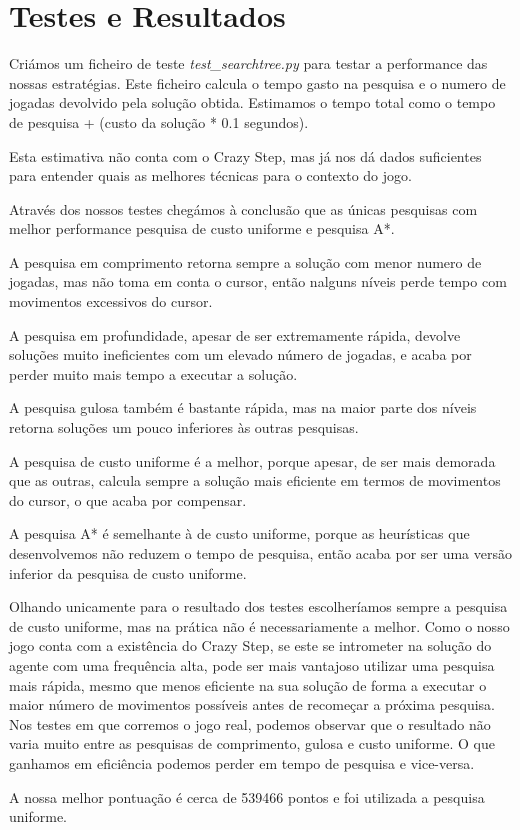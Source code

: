 \documentclass[12pt]{report}
\begin{document}
\newpage

\chapter{Testes e Resultados}

\par Criámos um ficheiro de teste \emph{test\_searchtree.py} para testar a performance das nossas estratégias. Este ficheiro calcula o tempo gasto na pesquisa e o numero de jogadas devolvido pela solução obtida. Estimamos o tempo total como o tempo de pesquisa + (custo da solução * 0.1 segundos).
\par Esta estimativa não conta com o Crazy Step, mas já nos dá dados suficientes para entender quais as melhores técnicas para o contexto do jogo.

\par Através dos nossos testes chegámos à conclusão que as únicas pesquisas com melhor performance pesquisa de custo uniforme e pesquisa A*.
\par A pesquisa em comprimento retorna sempre a solução com menor numero de jogadas, mas não toma em conta o cursor, então nalguns níveis perde tempo com movimentos excessivos do cursor.
\par A pesquisa em profundidade, apesar de ser extremamente rápida, devolve soluções muito ineficientes com um elevado número de jogadas, e acaba por perder muito mais tempo a executar a solução.
\par A pesquisa gulosa também é bastante rápida, mas na maior parte dos níveis retorna soluções um pouco inferiores às outras pesquisas.
\par A pesquisa de custo uniforme é a melhor, porque apesar, de ser mais demorada que as outras, calcula sempre a solução mais eficiente em termos de movimentos do cursor, o que acaba por compensar.
\par A pesquisa A* é semelhante à de custo uniforme, porque as heurísticas que desenvolvemos não reduzem o tempo de pesquisa, então acaba por ser uma versão inferior da pesquisa de custo uniforme.
\par Olhando unicamente para o resultado dos testes escolheríamos sempre a pesquisa de custo uniforme, mas na prática não é necessariamente a melhor. Como o nosso jogo conta com a existência do Crazy Step, se este se intrometer na solução do agente com uma frequência alta, pode ser mais vantajoso utilizar uma pesquisa mais rápida, mesmo que menos eficiente na sua solução de forma a executar o maior número de movimentos possíveis antes de recomeçar a próxima pesquisa. Nos testes em que corremos o jogo real, podemos observar que o resultado não varia muito entre as pesquisas de comprimento, gulosa e custo uniforme. O que ganhamos em eficiência podemos perder em tempo de pesquisa e vice-versa.

\par A nossa melhor pontuação é cerca de 539466 pontos e foi utilizada a pesquisa uniforme.

\printbibliography
\nocite{*}
\end{document}
